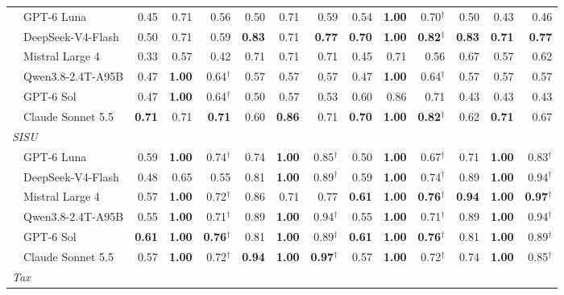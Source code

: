 \begin{table}[t]
\begin{tabular}{l@{\hspace{0.6em}}rrr@{\hspace{0.6em}}rrr@{\hspace{0.6em}}rrr@{\hspace{0.6em}}rrr}
  ~~GPT-6 Luna & 0.45 & 0.71 & 0.56 & 0.50 & 0.71 & 0.59 & 0.54 & \textbf{1.00} & 0.70$^\dagger$ & 0.50 & 0.43 & 0.46 \\
  ~~DeepSeek-V4-Flash & 0.50 & 0.71 & 0.59 & \textbf{0.83} & 0.71 & \textbf{0.77} & \textbf{0.70} & \textbf{1.00} & \textbf{0.82}$^\dagger$ & \textbf{0.83} & \textbf{0.71} & \textbf{0.77} \\
  ~~Mistral Large 4 & 0.33 & 0.57 & 0.42 & 0.71 & 0.71 & 0.71 & 0.45 & 0.71 & 0.56 & 0.67 & 0.57 & 0.62 \\
  ~~Qwen3.8-2.4T-A95B & 0.47 & \textbf{1.00} & 0.64$^\dagger$ & 0.57 & 0.57 & 0.57 & 0.47 & \textbf{1.00} & 0.64$^\dagger$ & 0.57 & 0.57 & 0.57 \\
  ~~GPT-6 Sol & 0.47 & \textbf{1.00} & 0.64$^\dagger$ & 0.50 & 0.57 & 0.53 & 0.60 & 0.86 & 0.71 & 0.43 & 0.43 & 0.43 \\
  ~~Claude Sonnet 5.5 & \textbf{0.71} & 0.71 & \textbf{0.71} & 0.60 & \textbf{0.86} & 0.71 & \textbf{0.70} & \textbf{1.00} & \textbf{0.82}$^\dagger$ & 0.62 & \textbf{0.71} & 0.67 \\
  \midrule
  \multicolumn{13}{l}{\textit{SISU}} \\
  ~~GPT-6 Luna & 0.59 & \textbf{1.00} & 0.74$^\dagger$ & 0.74 & \textbf{1.00} & 0.85$^\dagger$ & 0.50 & \textbf{1.00} & 0.67$^\dagger$ & 0.71 & \textbf{1.00} & 0.83$^\dagger$ \\
  ~~DeepSeek-V4-Flash & 0.48 & 0.65 & 0.55 & 0.81 & \textbf{1.00} & 0.89$^\dagger$ & 0.59 & \textbf{1.00} & 0.74$^\dagger$ & 0.89 & \textbf{1.00} & 0.94$^\dagger$ \\
  ~~Mistral Large 4 & 0.57 & \textbf{1.00} & 0.72$^\dagger$ & 0.86 & 0.71 & 0.77 & \textbf{0.61} & \textbf{1.00} & \textbf{0.76}$^\dagger$ & \textbf{0.94} & \textbf{1.00} & \textbf{0.97}$^\dagger$ \\
  ~~Qwen3.8-2.4T-A95B & 0.55 & \textbf{1.00} & 0.71$^\dagger$ & 0.89 & \textbf{1.00} & 0.94$^\dagger$ & 0.55 & \textbf{1.00} & 0.71$^\dagger$ & 0.89 & \textbf{1.00} & 0.94$^\dagger$ \\
  ~~GPT-6 Sol & \textbf{0.61} & \textbf{1.00} & \textbf{0.76}$^\dagger$ & 0.81 & \textbf{1.00} & 0.89$^\dagger$ & \textbf{0.61} & \textbf{1.00} & \textbf{0.76}$^\dagger$ & 0.81 & \textbf{1.00} & 0.89$^\dagger$ \\
  ~~Claude Sonnet 5.5 & 0.57 & \textbf{1.00} & 0.72$^\dagger$ & \textbf{0.94} & \textbf{1.00} & \textbf{0.97}$^\dagger$ & 0.57 & \textbf{1.00} & 0.72$^\dagger$ & 0.74 & \textbf{1.00} & 0.85$^\dagger$ \\
  \midrule
  \multicolumn{13}{l}{\textit{Tax}} \\

\end{tabular}
\end{table}
